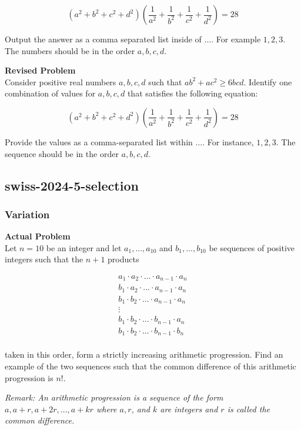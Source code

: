 $$(a^2+b^2+c^2+d^2)\left(\frac{1}{a^2}+\frac{1}{b^2}+\frac{1}{c^2}+\frac{1}{d^2}\right) = 28$$

Output the answer as a comma separated list inside of $\boxed{...}$. For example $\boxed{1, 2, 3}$.
The numbers should be in the order $a,b,c,d$.

\textbf{Revised Problem}\\
Consider positive real numbers \(a, b, c, d\) such that \(ab^2 + ac^2 \geq 6bcd\). Identify one combination of values for \(a, b, c, d\) that satisfies the following equation:

$$ (a^2+b^2+c^2+d^2)\left(\frac{1}{a^2}+\frac{1}{b^2}+\frac{1}{c^2}+\frac{1}{d^2}\right) = 28 $$

Provide the values as a comma-separated list within \(\boxed{...}\). For instance, \(\boxed{1, 2, 3}\).
The sequence should be in the order \(a,b,c,d\).

\subsection{swiss-2024-5-selection}
\subsubsection{Variation}
\textbf{Actual Problem}\\
Let $n = 10$ be an integer and let $a_1, ..., a_{10}$ and $b_1, ..., b_{10}$ be sequences of positive integers such that the $n+1$ products

\begin{align*}
    a_1 \cdot a_2 \cdot ... \cdot a_{n-1} \cdot a_{n} \\
    b_1 \cdot a_2 \cdot ... \cdot a_{n-1} \cdot a_{n} \\
    b_1 \cdot b_2 \cdot ... \cdot a_{n-1} \cdot a_{n} \\
    \vdots \\
    b_1 \cdot b_2 \cdot ... \cdot b_{n-1} \cdot a_{n} \\
    b_1 \cdot b_2 \cdot ... \cdot b_{n-1} \cdot b_{n} \\
\end{align*}

taken in this order, form a strictly increasing arithmetic progression. Find an example of the two sequences such that the common difference of this arithmetic progression is $n!$.

\textit{Remark: An arithmetic progression is a sequence of the form $a, a + r, a + 2r, ..., a + kr$ where $a, r$, and $k$ are integers and $r$ is called the common difference.}

